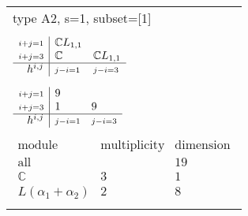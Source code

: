 \documentclass[crop,border=2mm]{standalone}
\begin{document}
\begin{tabular}{l}
{\huge type A2, s=1, subset=[1]}\\ \\


$\displaystyle
\begin{array}{r|l l}
	{\scriptstyle i+j=1}&\mathbb{C}L_{1,1}&\\
	{\scriptstyle i+j=3}&\mathbb{C}&\mathbb{C}L_{1,1}\\
	\hline h^{i,j}&{\scriptstyle j-i=1}&{\scriptstyle j-i=3}
\end{array}
$ \\ \\


$\displaystyle
\begin{array}{r|l l}
	{\scriptstyle i+j=1}&9&\\
	{\scriptstyle i+j=3}&1&9\\
	\hline h^{i,j}&{\scriptstyle j-i=1}&{\scriptstyle j-i=3}
\end{array}
$ \\ \\


$\displaystyle
\begin{array}{rll}
	\text{module}&\text{multiplicity}&\text{dimension} \\ \hline \text{all}&&19 \\
	\mathbb{C}&3&1\\
	L\left(\alpha_{1}+\alpha_{2}\right)&2&8
\end{array}
$ \\ \\

\end{tabular}
\end{document}
